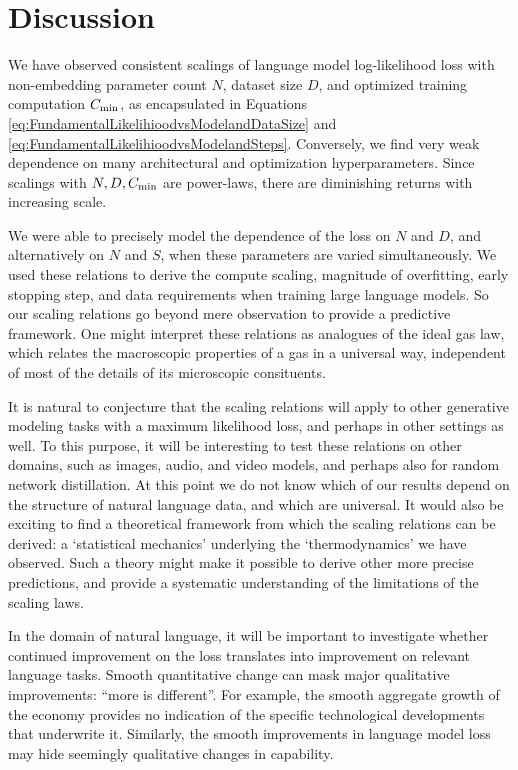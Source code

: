 \documentclass[english]{article}
\begin{document}
\section{Discussion}


We have observed consistent scalings of language model log-likelihood loss with non-embedding parameter count $N$, dataset size $D$, and optimized training computation $C_{\rm min}$, as encapsulated in Equations \eqref{eq:FundamentalLikelihioodvsModelandDataSize} and \eqref{eq:FundamentalLikelihioodvsModelandSteps}.  Conversely, we find very weak dependence on many architectural and optimization hyperparameters.  Since scalings with $N, D, C_{\rm min}$ are power-laws, there are diminishing returns with increasing scale.

We were able to precisely model the dependence of the loss on $N$ and $D$, and alternatively on $N$ and $S$, when these parameters are varied simultaneously.  We used these relations to derive the compute scaling, magnitude of overfitting, early stopping step, and data requirements when training large language models. So our scaling relations go beyond mere observation to provide a predictive framework.  One might interpret these relations as analogues of the ideal gas law, which relates the macroscopic properties of a gas in a universal way, independent of most of the details of its microscopic consituents.

It is natural to conjecture that the scaling relations will apply to other generative modeling tasks with a maximum likelihood loss, and perhaps in other settings as well.    To this purpose, it will be  interesting to test these relations on other domains, such as images, audio, and video models, and perhaps also for random network distillation.  At this point we do not know which of our results depend on the structure of natural language data, and which are universal.  It would also be exciting to find a theoretical framework from which the scaling relations can be derived: a `statistical mechanics' underlying the `thermodynamics' we have observed.  Such a theory might make it possible to derive other more precise predictions, and provide a systematic understanding of the limitations of the scaling laws.

In the domain of natural language, it will be important to investigate whether continued improvement on the loss translates into improvement on relevant language tasks.  Smooth quantitative change can mask major qualitative improvements: ``more is different''.  For example, the smooth aggregate growth of the economy provides no indication of the specific technological developments that underwrite it. Similarly, the smooth improvements in language model loss may hide seemingly qualitative changes in capability.
\end{document}
